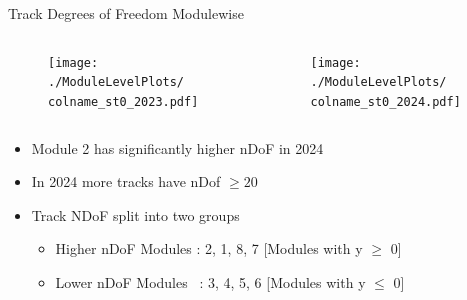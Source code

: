 \begin{frame}{Track Degrees of Freedom Modulewise}
    \newcommand{\colname}{Track_nDoF}
    \begin{columns}
        \begin{column}{0.6\linewidth}
            \begin{figure}
                \centering
                \texttt{[image: ./ModuleLevelPlots/\\colname\_st0\_2023.pdf]}
            \end{figure}
        \end{column}
        \begin{column}{0.6\linewidth}
            \begin{figure}
                \centering
                \texttt{[image: ./ModuleLevelPlots/\\colname\_st0\_2024.pdf]}
            \end{figure}
        \end{column}
    \end{columns}

    \begin{itemize}
        \small
        \item Module 2 has significantly higher nDoF in 2024
        \item In 2024 more tracks have nDof $\geq 20$
        \item Track NDoF split into two groups
        \begin{itemize}
            \item Higher nDoF Modules : 2, 1, 8, 7 [Modules with y $\geq$ 0]
            \item Lower nDoF Modules \ : 3, 4, 5, 6  [Modules with y $\leq$ 0]
        \end{itemize}
    \end{itemize}
\end{frame}


